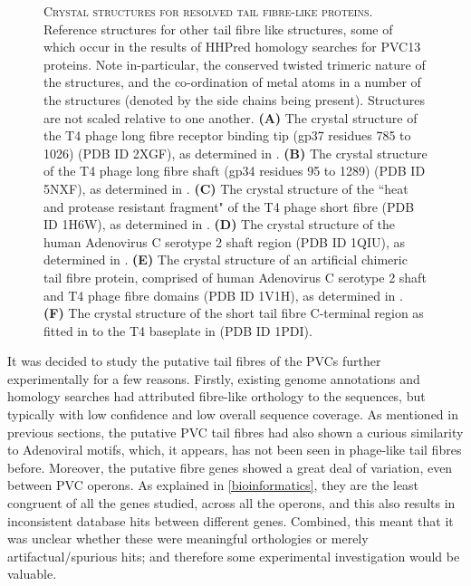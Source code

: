 \begin{figure}[p]
	\captionsetup{singlelinecheck=off, justification=justified, font=footnotesize, aboveskip=10pt}
	\caption[Existing resolved tail fibre protein structures]{\textsc{\normalsize Crystal structures for resolved tail fibre-like proteins.}\vspace{0.1cm} \newline Reference structures for other tail fibre like structures, some of which occur in the results of HHPred homology searches for PVC13 proteins. Note in-particular, the conserved twisted trimeric nature of the structures, and the co-ordination of metal atoms in a number of the structures (denoted by the side chains being present). Structures are not scaled relative to one another. \textbf{(A)} The crystal structure of the T4 phage long fibre receptor binding tip (gp37 residues 785 to 1026) (PDB ID 2XGF), as determined in \cite{Bartual2010}. \textbf{(B)} The crystal structure of the T4 phage long fibre shaft (gp34 residues 95 to 1289) (PDB ID 5NXF), as determined in \cite{Granell2014a}. \textbf{(C)} The crystal structure of the ``heat and protease resistant fragment" of the T4 phage short fibre (PDB ID 1H6W), as determined in \cite{VanRaaij2001}. \textbf{(D)} The crystal structure of the human Adenovirus C serotype 2 shaft region (PDB ID 1QIU), as determined in \cite{VanRaaij1999}. \textbf{(E)} The crystal structure of an artificial chimeric tail fibre protein, comprised of human Adenovirus C serotype 2 shaft and T4 phage fibre domains (PDB ID 1V1H), as determined in \cite{Papanikolopoulou2004}. \textbf{(F)} The crystal structure of the short tail fibre C-terminal region as fitted in to the T4 baseplate in \cite{Kostyuchenko2003} (PDB ID 1PDI). }
	\label{tailfibrestructures}
\end{figure}


It was decided to study the putative tail fibres of the PVCs further experimentally for a few reasons. Firstly, existing genome annotations and homology searches had attributed fibre-like orthology to the sequences, but typically with low confidence and low overall sequence coverage. As mentioned in previous sections, the putative PVC tail fibres had also shown a curious similarity to Adenoviral motifs, which, it appears, has not been seen in phage-like tail fibres before. Moreover, the putative fibre genes showed a great deal of variation, even between PVC operons. As explained in \vref{bioinformatics}, they are the least congruent of all the genes studied, across all the operons, and this also results in inconsistent database hits between different genes. Combined, this meant that it was unclear whether these were meaningful orthologies or merely artifactual/spurious hits; and therefore some experimental investigation would be valuable.

